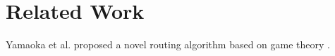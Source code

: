 \chapter{Related Work} \label{sec:relatedwork}
Yamaoka et al. proposed a novel routing algorithm based on game theory \cite{yamaoka}.
